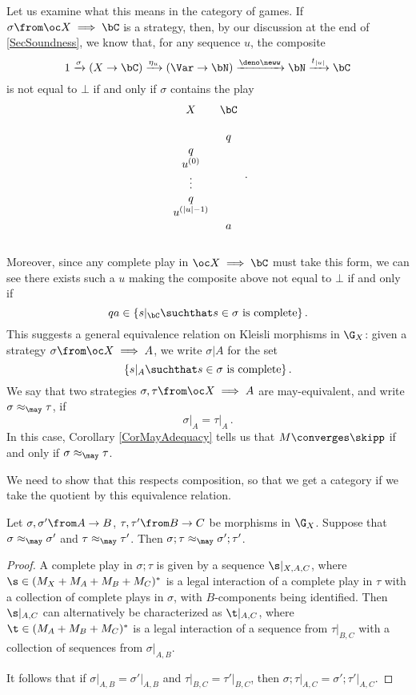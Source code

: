 Let us examine what this means in the category of games.
If $\sigma\from \oc X \implies \bC$ is a strategy, then, by our discussion at the end of \sec\ref{SecSoundness}, we know that, for any sequence $u$, the composite
\[
  1 \xrightarrow{\sigma}
  (X \to \bC) \xrightarrow{\eta_u}
  (\Var \to \bN) \xrightarrow{\deno\neww}
  \bN \xrightarrow{t_{|u|}}
  \bC
  \]
is not equal to $\bot$ if and only if $\sigma$ contains the play
\[
  \begin{array}{cc}
    X         & \bC \\
              &     \\
              &  q  \\
    q         &     \\
    u^{(0)}   &     \\
    \vdots    &     \\
    q         &     \\
    u^{(|u|-1)}&     \\
              &  a  \\
              &     \\
  \end{array}\,.
  \]
Moreover, since any complete play in $\oc X \implies \bC$ must take this form, we can see there exists such a $u$ making the composite above not equal to $\bot$ if and only if
\[
  qa \in \{s\vert_\bC \suchthat s\in\sigma\text{ is complete}\}\,.
  \]
This suggests a general equivalence relation on Kleisli morphisms in $\G_X$: given a strategy $\sigma\from \oc X \implies A$, we write $\sigma\vert A$ for the set
\[
  \{s\vert_A \suchthat s\in \sigma\text{ is complete}\}\,.
  \]
We say that two strategies $\sigma,\tau\from \oc X \implies A$ are may-equivalent, and write $\sigma\approx_{\may}\tau$, if
\[
  \sigma\vert_A = \tau\vert_A\,.
  \]
In this case, Corollary \ref{CorMayAdequacy} tells us that $M\converges \skipp$ if and only if $\sigma\approx_{\may}\tau$.

We need to show that this respects composition, so that we get a category if we take the quotient by this equivalence relation.
\begin{proposition}
  Let $\sigma,\sigma' \from A \to B$, $\tau,\tau'\from B \to C$ be morphisms in $\G_X$.
  Suppose that $\sigma\approx_{\may}\sigma'$ and $\tau\approx_{\may}\tau'$.  
  Then $\sigma;\tau \approx_{\may} \sigma';\tau'$.
\end{proposition}
\begin{proof}
  A complete play in $\sigma;\tau$ is given by a sequence $\s\vert_{X,A,C}$, where $\s\in (M_X + M_A + M_B + M_C)^*$ is a legal interaction of a complete play in $\tau$ with a collection of complete plays in $\sigma$, with $B$-components being identified.
  Then $\s\vert_{A,C}$ can alternatively be characterized as $\t\vert_{A,C}$, where $\t\in (M_A + M_B + M_C)^*$ is a legal interaction of a sequence from $\tau\vert_{B,C}$ with a collection of sequences from $\sigma\vert_{A,B}$.  

  It follows that if $\sigma\vert_{A,B}=\sigma'\vert_{A,B}$ and $\tau\vert_{B,C}=\tau'\vert_{B,C}$, then $\sigma;\tau\vert_{A,C} = \sigma';\tau'\vert_{A,C}$.
\end{proof}

